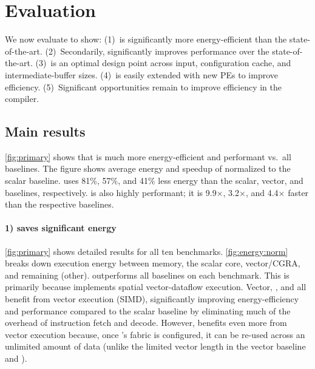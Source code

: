 \section{Evaluation}
\label{snafu:eval}

\figSNAFUPrimaryResults

We now evaluate \snafuarch to show:
(1)~\snafuarch is significantly more energy-efficient than the state-of-the-art.
(2)~Secondarily, \snafuarch significantly improves performance over the state-of-the-art.
(3)~\snafuarch is an optimal design point across input, configuration cache, and intermediate-buffer sizes.
(4)~\snafuframe is easily extended with new PEs to improve efficiency.
(5)~Significant opportunities remain to improve efficiency in the compiler.

\figSNAFUSensUnrollResults

\subsection{Main results}
\autoref{fig:primary} shows that \snafuarch is much more energy-efficient and performant vs.\ all baselines.
% 
The figure shows average energy and speedup of \snafuarch normalized to the scalar baseline.
% 
\snafuarch uses 81\%, 57\%, and 41\% less energy than the scalar, vector, and \manic baselines, respectively.
% 
\snafuarch is also highly performant; it is 9.9$\times$, 3.2$\times$, and 4.4$\times$ faster than the respective baselines.
% 

\paragraph{1) \snafuarch saves significant energy}
\autoref{fig:primary} shows detailed results for all ten benchmarks.
% 
\autoref{fig:energy:norm} breaks down execution energy between memory, the scalar core, vector/CGRA, and remaining (other).
% 
\snafuarch outperforms all baselines on each benchmark.
% 
This is primarily because \snafuarch implements spatial vector-dataflow execution.
%
Vector, \manic, and \snafuarch all benefit from vector execution (SIMD), significantly improving energy-efficiency and performance compared to the scalar baseline by eliminating much of the overhead of instruction fetch and decode.
%
However, \snafuarch benefits even more from vector execution
because, once \snafuarch's fabric is configured, it can be re-used across an unlimited amount of data
(unlike the limited vector length in the vector baseline and \manic).

